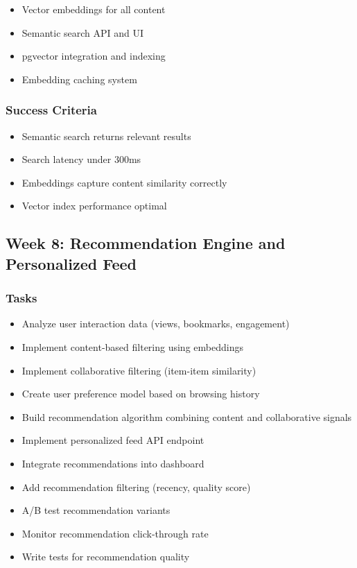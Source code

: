 \documentclass[12pt,oneside]{report}
\begin{document}
\begin{itemize}
    \item Vector embeddings for all content
    \item Semantic search API and UI
    \item pgvector integration and indexing
    \item Embedding caching system
\end{itemize}

\subsubsection{Success Criteria}

\begin{itemize}
    \item Semantic search returns relevant results
    \item Search latency under 300ms
    \item Embeddings capture content similarity correctly
    \item Vector index performance optimal
\end{itemize}

\subsection{Week 8: Recommendation Engine and Personalized Feed}

\subsubsection{Tasks}

\begin{itemize}
    \item Analyze user interaction data (views, bookmarks, engagement)
    \item Implement content-based filtering using embeddings
    \item Implement collaborative filtering (item-item similarity)
    \item Create user preference model based on browsing history
    \item Build recommendation algorithm combining content and collaborative signals
    \item Implement personalized feed API endpoint
    \item Integrate recommendations into dashboard
    \item Add recommendation filtering (recency, quality score)
    \item A/B test recommendation variants
    \item Monitor recommendation click-through rate
    \item Write tests for recommendation quality
\end{itemize}
\end{document}
